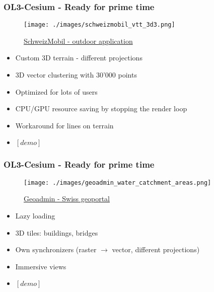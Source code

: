 \documentclass[handout]{beamer}
\begin{document}
  \begin{frame}
    \frametitle{OL3-Cesium - Ready for prime time}
    \begin{figure}
    \begin{center}
      \texttt{[image: ./images/schweizmobil\_vtt\_3d3.png]}
    \end{center}
    \href {https://map.schweizmobil.ch/?cesium&trackId=2149217&lang=fr&bgLayer=lb&resolution=10.86&X=561417&Y=141893&layers=Bus\%2CWanderland}{SchweizMobil - outdoor application}
    \end{figure}

    \begin{itemize}
      \pause\item Custom 3D terrain - different projections
      \pause\item 3D vector clustering with 30'000 points
      \pause\item Optimized for lots of users
      \pause\item CPU/GPU resource saving by stopping the render loop
      \pause\item Workaround for lines on terrain
      \pause\item $[demo]$
     \end{itemize}
  \end{frame}

  \begin{frame}
    \frametitle{OL3-Cesium - Ready for prime time}
    \begin{figure}
    \begin{center}
      \texttt{[image: ./images/geoadmin\_water\_catchment\_areas.png]}
    \end{center}
    \href {https://map.geo.admin.ch/?pegman=true&topic=ech&lang=en&bgLayer=ch.swisstopo.pixelkarte-farbe&layers=ch.swisstopo.zeitreihen,ch.bfs.gebaeude_wohnungs_register,ch.bav.haltestellen-oev,ch.swisstopo.swisstlm3d-wanderwege,ch.swisstopo.swissimage-product&layers_visibility=false,false,true,true,true&layers_timestamp=18641231,,,,&lon=7.02474&lat=46.35425&elevation=6028&heading=0.000&pitch=-50.000}{Geoadmin - Swiss geoportal}
    \end{figure}

    \begin{itemize}
      \pause\item Lazy loading
      \pause\item 3D tiles: buildings, bridges
      \pause\item Own synchronizers (raster $\rightarrow$ vector, different projections)
      \pause\item Immersive views
      \pause\item $[demo]$
    \end{itemize}
  \end{frame}
\end{document}

